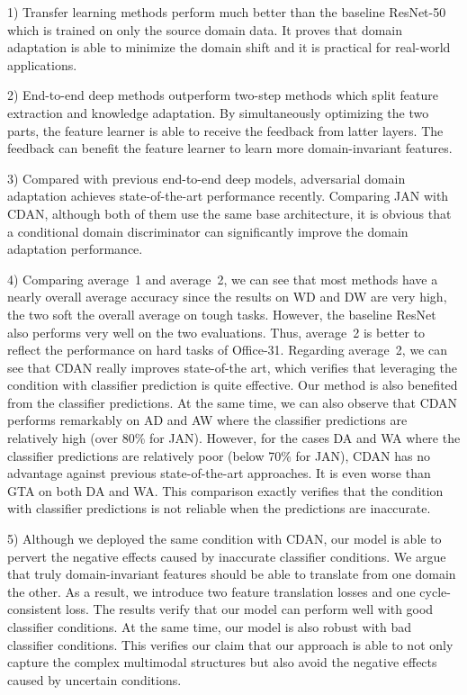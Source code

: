 \documentclass[sigconf]{acmart}
\begin{document}
1) Transfer learning methods perform much better than the baseline ResNet-50 which is trained on only the source domain data. It proves that domain adaptation is able to minimize the domain shift and it is practical for real-world applications.

2) End-to-end deep methods outperform two-step methods which split feature extraction and knowledge adaptation. By simultaneously optimizing the two parts, the feature learner is able to receive the feedback from latter layers. The feedback can benefit the feature learner to learn more domain-invariant features.

3) Compared with previous end-to-end deep models, adversarial domain adaptation achieves state-of-the-art performance recently. Comparing JAN with CDAN, although both of them use the same base architecture, it is obvious that a conditional domain discriminator can significantly improve the domain adaptation performance.

4) Comparing average~1 and average~2, we can see that most methods have a nearly overall average accuracy since the results on WD and DW are very high, the two soft the overall average on tough tasks. However, the baseline ResNet also performs very well on the two evaluations. Thus, average~2 is better to reflect the performance on hard tasks of Office-31. Regarding average~2, we can see that CDAN really improves state-of-the art, which verifies that leveraging the condition with classifier prediction is quite effective. Our method is also benefited from the classifier predictions. At the same time, we can also observe that CDAN performs remarkably on AD and AW where the classifier predictions are relatively high (over 80\% for JAN). However, for the cases DA and WA where the classifier predictions are relatively poor (below 70\% for JAN), CDAN has no advantage against previous state-of-the-art approaches. It is even worse than GTA on both DA and WA. This comparison exactly verifies that the condition with classifier predictions is not reliable when the predictions are inaccurate.

5) Although we deployed the same condition with CDAN, our model is able to pervert the negative effects caused by inaccurate classifier conditions. We argue that truly domain-invariant features should be able to translate from one domain the other. As a result, we introduce two feature translation losses and one cycle-consistent loss. The results verify that our model can perform well with good classifier conditions. At the same time, our model is also robust with bad classifier conditions. This verifies our claim that our approach is able to not only capture the complex multimodal structures but also avoid the negative effects caused by uncertain conditions.
\end{document}
